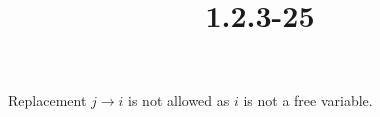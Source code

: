 \documentclass{article}
\title{1.2.3-25}
\begin{document}
\maketitle

Replacement $j \to i$ is not allowed as $i$ is not a free variable.
\end{document}
